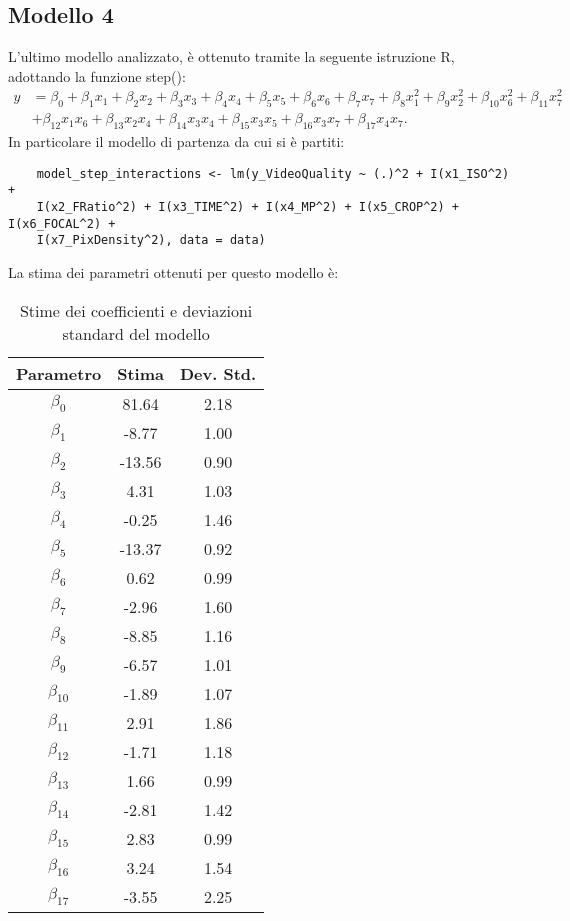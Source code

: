 \subsection{Modello 4}
L'ultimo modello analizzato, è ottenuto tramite la seguente istruzione R, adottando la funzione step():
\begin{align*}
	y &= \beta_0 
	+ \beta_1 x_1 + \beta_2 x_2 + \beta_3 x_3 + \beta_4 x_4 + \beta_5 x_5 
	+ \beta_6 x_6 + \beta_7 x_7 
	+ \beta_8 x_1^2 + \beta_9 x_2^2 + \beta_{10} x_6^2 + \beta_{11} x_7^2 \\
	&+ \beta_{12} x_1 x_6 + \beta_{13} x_2 x_4 + \beta_{14} x_3 x_4 
	+ \beta_{15} x_3 x_5 + \beta_{16} x_3 x_7 
	+ \beta_{17} x_4 x_7.
\end{align*}
In particolare il modello di partenza da cui si è partiti:
\begin{verbatim}
	model_step_interactions <- lm(y_VideoQuality ~ (.)^2 + I(x1_ISO^2) + 
	I(x2_FRatio^2) + I(x3_TIME^2) + I(x4_MP^2) + I(x5_CROP^2) + I(x6_FOCAL^2) + 
	I(x7_PixDensity^2), data = data)
\end{verbatim}
La stima dei parametri ottenuti per questo modello è:
\begin{table}[H]
	\centering
	\begin{tabular}{|c|c|c|}
		\hline
		\textbf{Parametro} & \textbf{Stima} & \textbf{Dev. Std.} \\
		\hline
		$\beta_0$   & 81.64  & 2.18 \\
		$\beta_1$   & -8.77  & 1.00 \\
		$\beta_2$   & -13.56 & 0.90 \\
		$\beta_3$   & 4.31   & 1.03 \\
		$\beta_4$   & -0.25  & 1.46 \\
		$\beta_5$   & -13.37 & 0.92 \\
		$\beta_6$   & 0.62   & 0.99 \\
		$\beta_7$   & -2.96  & 1.60 \\
		$\beta_8$   & -8.85  & 1.16 \\
		$\beta_9$   & -6.57  & 1.01 \\
		$\beta_{10}$ & -1.89  & 1.07 \\
		$\beta_{11}$ & 2.91   & 1.86 \\
		$\beta_{12}$ & -1.71  & 1.18 \\
		$\beta_{13}$ & 1.66   & 0.99 \\
		$\beta_{14}$ & -2.81  & 1.42 \\
		$\beta_{15}$ & 2.83   & 0.99 \\
		$\beta_{16}$ & 3.24   & 1.54 \\
		$\beta_{17}$ & -3.55  & 2.25 \\
		\hline
	\end{tabular}
	\caption{Stime dei coefficienti e deviazioni standard del modello}
	\label{tab:stima_coef_std}
\end{table}
